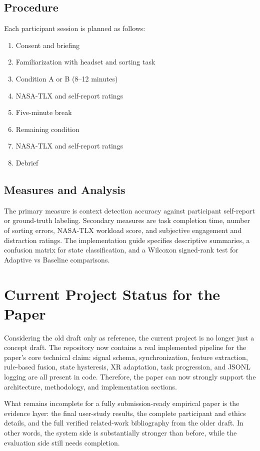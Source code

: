 \documentclass[10pt,twocolumn]{article}
\begin{document}
\subsection{Procedure}
Each participant session is planned as follows:
\begin{enumerate}[leftmargin=1.2em]
  \item Consent and briefing
  \item Familiarization with headset and sorting task
  \item Condition A or B (8--12 minutes)
  \item NASA-TLX and self-report ratings
  \item Five-minute break
  \item Remaining condition
  \item NASA-TLX and self-report ratings
  \item Debrief
\end{enumerate}

\subsection{Measures and Analysis}
The primary measure is context detection accuracy against participant self-report or ground-truth labeling. Secondary measures are task completion time, number of sorting errors, NASA-TLX workload score, and subjective engagement and distraction ratings. The implementation guide specifies descriptive summaries, a confusion matrix for state classification, and a Wilcoxon signed-rank test for Adaptive vs Baseline comparisons.

\section{Current Project Status for the Paper}
Considering the old draft only as reference, the current project is no longer just a concept draft. The repository now contains a real implemented pipeline for the paper's core technical claim: signal schema, synchronization, feature extraction, rule-based fusion, state hysteresis, XR adaptation, task progression, and JSONL logging are all present in code. Therefore, the paper can now strongly support the architecture, methodology, and implementation sections.

What remains incomplete for a fully submission-ready empirical paper is the evidence layer: the final user-study results, the complete participant and ethics details, and the full verified related-work bibliography from the older draft. In other words, the system side is substantially stronger than before, while the evaluation side still needs completion.
\end{document}

